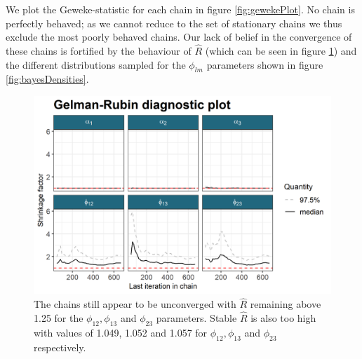 \documentclass[]{article}
\begin{document}
We plot the Geweke-statistic for each chain in figure \ref{fig:gewekePlot}. No chain is perfectly behaved; as we cannot reduce to the set of stationary chains we thus exclude the most poorly behaved chains. Our lack of belief in the convergence of these chains is fortified by the behaviour of $\hat{R}$ (which can be seen in figure \ref{fig:gelmanPlot}) and the different distributions sampled for the $\phi_{lm}$ parameters shown in figure \ref{fig:bayesDensities}.
\begin{figure}
	\centering
	\includegraphics[scale=1.0]{./Images/Yeast/Convergence/gelmanPlot.png}
	\caption{The chains still appear to be unconverged with $\hat{R}$ remaining above 1.25 for the $\phi_{12}, \phi_{13}$ and $\phi_{23}$ parameters. Stable $\hat{R}$ is also too high with values of 1.049, 1.052 and 1.057 for $\phi_{12}, \phi_{13}$ and $\phi_{23}$ respectively.}
	\label{fig:gelmanPlot}
\end{figure}
\end{document}
